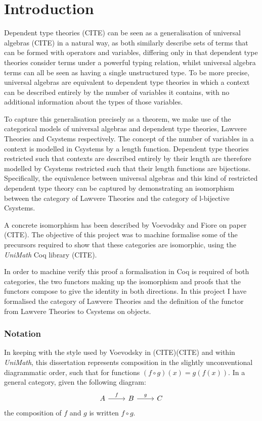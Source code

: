\chapter{Introduction}
Dependent type theories (CITE) can be seen as a generalisation of universal
algebras (CITE) in a natural way, as both similarly describe sets of terms that
can be formed with operators and variables, differing only in that dependent
type theories consider terms under a powerful typing relation, whilst universal
algebra terms can all be seen as having a single unstructured type. To be more
precise, universal algebras are equivalent to dependent type theories in which a
context can be described entirely by the number of variables it contains, with
no additional information about the types of those variables.

To capture this generalisation precisely as a theorem, we make use of the
categorical models of universal algebras and dependent type theories, Lawvere
Theories and Csystems respectively. The concept of the number of variables in a
context is modelled in Csystems by a length function. Dependent type theories
restricted such that contexts are described entirely by their length are
therefore modelled by Csystems restricted such that their length functions are
bijections. Specifically, the equivalence between universal algebras and this
kind of restricted dependent type theory can be captured by demonstrating an
isomorphism between the category of Lawvere Theories and the category of
l-bijective Csystems.

A concrete isomorphism has been described by Voevodsky and Fiore on paper
(CITE). The objective of this project was to machine formalise some of the
precursors required to show that these categories are isomorphic, using the
\textit{UniMath} Coq library (CITE). 

In order to machine verify this proof a formalisation in Coq is required of
both categories, the two functors making up the isomorphism and proofs that the
functors compose to give the identity in both directions. In this project I have
formalised the category of Lawvere Theories and the definition of the functor
from Lawvere Theories to Csystems on objects.

\subsection*{Notation}
In keeping with the style used by Voevodsky in (CITE)(CITE) and within
\textit{UniMath}, this dissertation represents composition in the slightly
unconventional diagrammatic order, such that for functions $(f\circ g)(x) =
g(f(x))$. In a general category, given the following diagram:
\[
\begin{tikzcd}
    A\ar[r,"f"]&B\ar[r,"g"]&C
\end{tikzcd}
\]
the composition of $f$ and $g$ is written $f\circ g$.